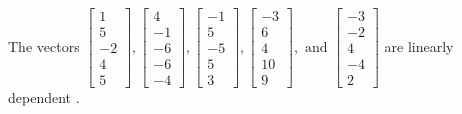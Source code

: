 \begin{exercise}
\begin{exerciseStatement}
  \end{exerciseStatement}
  \begin{exerciseAnswer}
   The vectors \(\left[\begin{array}{r}
1 \\
5 \\
-2 \\
4 \\
5
\end{array}\right] , \left[\begin{array}{r}
4 \\
-1 \\
-6 \\
-6 \\
-4
\end{array}\right] , \left[\begin{array}{r}
-1 \\
5 \\
-5 \\
5 \\
3
\end{array}\right] , \left[\begin{array}{r}
-3 \\
6 \\
4 \\
10 \\
9
\end{array}\right] , \text{ and } \left[\begin{array}{r}
-3 \\
-2 \\
4 \\
-4 \\
2
\end{array}\right]\) are 
  	 linearly dependent  .
  


  \end{exerciseAnswer}
\end{exercise}